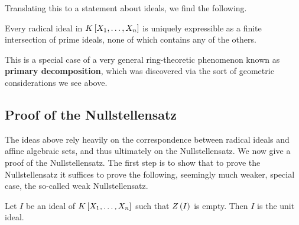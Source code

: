 Translating this to a statement about ideals, we find the following.

\begin{corollary}
Every radical ideal in $ K\sb{X_1, \dots, X_n} $ is uniquely expressible as a finite intersection of prime ideals, none of which contains any of the others.
\end{corollary}

This is a special case of a very general ring-theoretic phenomenon known as \textbf{primary decomposition}, which was discovered via the sort of geometric considerations we see above.

\subsection{Proof of the Nullstellensatz}

The ideas above rely heavily on the correspondence between radical ideals and affine algebraic sets, and thus ultimately on the Nullstellensatz. We now give a proof of the Nullstellensatz. The first step is to show that to prove the Nullstellensatz it suffices to prove the following, seemingly much weaker, special case, the so-called weak Nullstellensatz.

\begin{theorem}
\label{thm:13.3.1}
Let $ I $ be an ideal of $ K\sb{X_1, \dots, X_n} $ such that $ Z\rb{I} $ is empty. Then $ I $ is the unit ideal.
\end{theorem}

